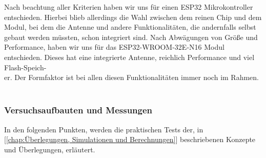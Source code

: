 \documentclass[titlepage,12pt,twoside]{article}
\begin{document}
Nach beachtung aller Kriterien haben wir uns für einen ESP32 Mikrokontroller entschieden. Hierbei blieb allerdings die Wahl zwischen
dem reinen Chip und dem Modul, bei dem die Antenne und andere Funktionalitäten, die andernfalls selbst gebaut werden müssten,
schon integriert sind. Nach Abwägungen von Größe und Performance, haben wir uns für das ESP32-WROOM-32E-N16 Modul entschieden.
Dieses hat eine integrierte Antenne, reichlich Performance und viel Flash-Speich-\\er. Der Formfaktor ist bei allen diesen 
Funktionalitäten immer noch im Rahmen. \\
\\

\subsubsection{Versuchsaufbauten und Messungen}
In den folgenden Punkten, werden die praktischen Tests der, in [\textcolor{blue}{\autoref{chap:Überlegungen, Simulationen und Berechnungen}}] beschriebenen Konzepte und Überlegungen, erläutert.\\
\newpage
\end{document}
